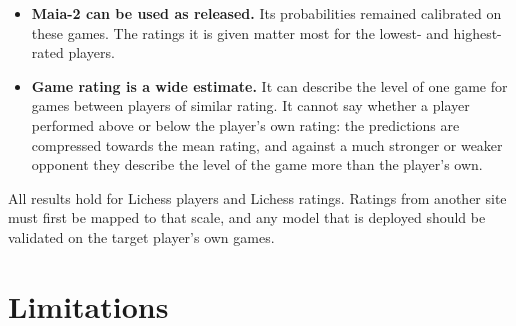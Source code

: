 \documentclass[11pt]{article}
\begin{document}
\begin{itemize}
indicates the relevant squares before the move is revealed, and puzzle
themes names the motif for the tags that Table~\ref{tab:themes} shows are
predicted well.
\item \textbf{Maia-2 can be used as released.} Its probabilities remained
calibrated on these games. The ratings it is given matter most for the
lowest- and highest-rated players.
\item \textbf{Game rating is a wide estimate.} It can describe the level of
one game for games between players of similar rating. It cannot say whether a
player performed above or below the player's own rating: the predictions are
compressed towards the mean rating, and against a much stronger or weaker
opponent they describe the level of the game more than the player's own.
\end{itemize}

All results hold for Lichess players and Lichess ratings. Ratings from
another site must first be mapped to that scale, and any model that is
deployed should be validated on the target player's own games.

\section{Limitations}
\label{sec:limits}
\end{document}
